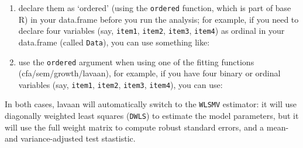 \begin{enumerate}
\def\labelenumi{\arabic{enumi}.}
\item
  declare them as `ordered' (using the \texttt{ordered} function, which
  is part of base R) in your data.frame before you run the analysis; for
  example, if you need to declare four variables (say, \texttt{item1},
  \texttt{item2}, \texttt{item3}, \texttt{item4}) as ordinal in your
  data.frame (called \texttt{Data}), you can use something like:

\begin{Shaded}
\begin{Highlighting}[]
\NormalTok{Data[,}\NormalTok{(}\NormalTok{,}
        \NormalTok{,}
        \NormalTok{,}
        \NormalTok{)] <-}
\StringTok{    }\NormalTok{(Data[,}\NormalTok{(}\NormalTok{,}
                   \NormalTok{,}
                   \NormalTok{,}
                   \NormalTok{)], ordered)}
\end{Highlighting}
\end{Shaded}
\item
  use the \texttt{ordered} argument when using one of the fitting
  functions (cfa/sem/growth/lavaan), for example, if you have four
  binary or ordinal variables (say, \texttt{item1}, \texttt{item2},
  \texttt{item3}, \texttt{item4}), you can use:

\begin{Shaded}
\begin{Highlighting}[]
\StringTok{ }
           \NormalTok{(}\NormalTok{,}\NormalTok{,}
                     \NormalTok{,}\NormalTok{))}
\end{Highlighting}
\end{Shaded}
\end{enumerate}

In both cases, lavaan will automatically switch to the \texttt{WLSMV}
estimator: it will use diagonally weighted least squares (\texttt{DWLS})
to estimate the model parameters, but it will use the full weight matrix
to compute robust standard errors, and a mean- and variance-adjusted
test stastistic.
